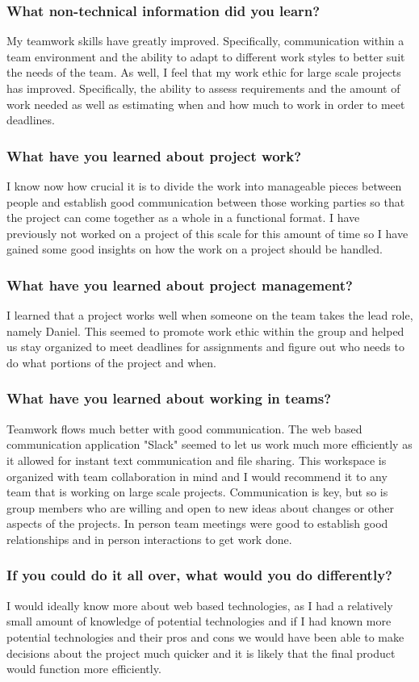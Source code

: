 \documentclass[journal,10pt,onecolumn,compsoc]{IEEEtran}
\begin{document}
    \subsubsection{What non-technical information did you learn?}
	My teamwork skills have greatly improved. Specifically, communication within a team environment and the ability to adapt to different work styles to better suit the needs of the team. As well, I feel that my work ethic for large scale projects has improved. Specifically, the ability to assess requirements and the amount of work needed as well as estimating when and how much to work in order to meet deadlines. 
    \subsubsection{What have you learned about project work?}
	I know now how crucial it is to divide the work into manageable pieces between people and establish good communication between those working parties so that the project can come together as a whole in a functional format. I have previously not worked on a project of this scale for this amount of time so I have gained some good insights on how the work on a project should be handled.
    \subsubsection{What have you learned about project management?}
	I learned that a project works well when someone on the team takes the lead role, namely Daniel. This seemed to promote work ethic within the group and helped us stay organized to meet deadlines for assignments and figure out who needs to do what portions of the project and when.
    \subsubsection{What have you learned about working in teams?}
	Teamwork flows much better with good communication. The web based communication application "Slack" seemed to let us work much more efficiently as it allowed for instant text communication and file sharing. This workspace is organized with team collaboration in mind and I would recommend it to any team that is working on large scale projects. Communication is key, but so is group members who are willing and open to new ideas about changes or other aspects of the projects. In person team meetings were good to establish good relationships and in person interactions to get work done. 
    \subsubsection{If you could do it all over, what would you do differently?} 
	I would ideally know more about web based technologies, as I had a relatively small amount of knowledge of potential technologies and if I had known more potential technologies and their pros and cons we would have been able to make decisions about the project much quicker and it is likely that the final product would function more efficiently. 
\end{document}
